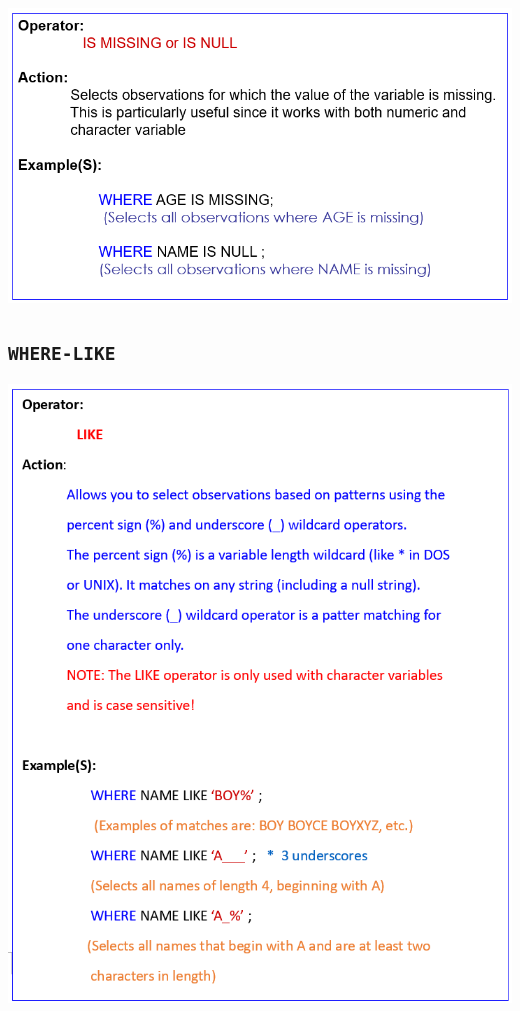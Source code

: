 \documentclass[
]{book}
\begin{document}
\begin{center}\includegraphics[width=1\linewidth]{img09/w09-WHERE_IS_MISSING} \end{center}

\hypertarget{where-like}{%
\subsection{\texorpdfstring{\texttt{WHERE-LIKE}}{WHERE-LIKE}}\label{where-like}}

\begin{center}\includegraphics[width=1\linewidth]{img09/w09-WHERE_LIKE} \end{center}
\end{document}
